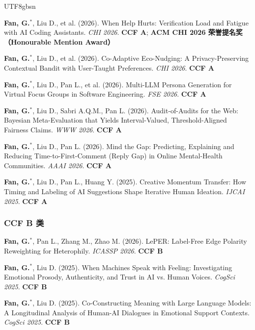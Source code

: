 \documentclass[a4paper,10pt]{article}
\newcommand{\pubitem}[1]{\item #1}
\begin{document}
\begin{CJK*}{UTF8}{gbsn}
\begin{enumerate}[label={[C\arabic*]}]
    \pubitem{\textbf{Fan, G.}$^*$, Liu D., et al. (2026). When Help Hurts: Verification Load and Fatigue with AI Coding Assistants. \textit{CHI 2026}. \textbf{CCF A}; \textbf{ACM CHI 2026 荣誉提名奖（Honourable Mention Award）}}
    
    \pubitem{\textbf{Fan, G.}$^*$, Liu D., et al. (2026). Co-Adaptive Eco-Nudging: A Privacy-Preserving Contextual Bandit with User-Taught Preferences. \textit{CHI 2026}. \textbf{CCF A}}
    
    \pubitem{\textbf{Fan, G.}$^*$, Liu D., Pan L., et al. (2026). Multi-LLM Persona Generation for Virtual Focus Groups in Software Engineering. \textit{FSE 2026}. \textbf{CCF A}}
    
    \pubitem{\textbf{Fan, G.}$^*$, Liu D., Sabri A.Q.M., Pan L. (2026). Audit-of-Audits for the Web: Bayesian Meta-Evaluation that Yields Interval-Valued, Threshold-Aligned Fairness Claims. \textit{WWW 2026}. \textbf{CCF A}}
    
    \pubitem{\textbf{Fan, G.}$^*$, Liu D., Pan L. (2026). Mind the Gap: Predicting, Explaining and Reducing Time-to-First-Comment (Reply Gap) in Online Mental-Health Communities. \textit{AAAI 2026}. \textbf{CCF A}}
    
    \pubitem{\textbf{Fan, G.}$^*$, Liu D., Pan L., Huang Y. (2025). Creative Momentum Transfer: How Timing and Labeling of AI Suggestions Shape Iterative Human Ideation. \textit{IJCAI 2025}. \textbf{CCF A}}
\end{enumerate}

\subsubsection*{CCF B 类}

\begin{enumerate}[label={[C\arabic*]}, resume]
    \pubitem{\textbf{Fan, G.}$^*$, Pan L., Zhang M., Zhao M. (2026). LePER: Label-Free Edge Polarity Reweighting for Heterophily. \textit{ICASSP 2026}. \textbf{CCF B}}
    
    \pubitem{\textbf{Fan, G.}$^*$, Liu D. (2025). When Machines Speak with Feeling: Investigating Emotional Prosody, Authenticity, and Trust in AI vs. Human Voices. \textit{CogSci 2025}. \textbf{CCF B}}
    
    \pubitem{\textbf{Fan, G.}$^*$, Liu D. (2025). Co-Constructing Meaning with Large Language Models: A Longitudinal Analysis of Human-AI Dialogues in Emotional Support Contexts. \textit{CogSci 2025}. \textbf{CCF B}}
\end{enumerate}


\end{CJK*}
\end{document}
